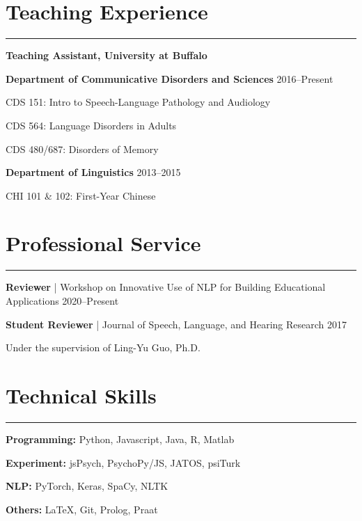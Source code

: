 \documentclass[11pt]{article}
\newcommand{\cvsection}[1]{\vspace{-0.2cm}\section*{\Large #1}\vspace{-0.2cm}\hrule\vspace{0.2cm}}
\begin{document}
\cvsection{Teaching Experience}

\textbf{Teaching Assistant, University at Buffalo}

\textbf{Department of Communicative Disorders and Sciences} \hfill 2016--Present

\quad CDS 151: Intro to Speech-Language Pathology and Audiology

\quad CDS 564: Language Disorders in Adults

\quad CDS 480/687: Disorders of Memory

\textbf{Department of Linguistics} \hfill 2013--2015

\quad CHI 101 \& 102: First-Year Chinese


\cvsection{Professional Service}

\textbf{Reviewer} | Workshop on Innovative Use of NLP for Building Educational Applications \hfill 2020--Present

\textbf{Student Reviewer} | Journal of Speech, Language, and Hearing Research \hfill 2017

\quad Under the supervision of Ling-Yu Guo, Ph.D.

\cvsection{Technical Skills}

\textbf{Programming:} Python, Javascript, Java, R, Matlab

\textbf{Experiment:} jsPsych, PsychoPy/JS, JATOS, psiTurk

\textbf{NLP:} PyTorch, Keras, SpaCy, NLTK

\textbf{Others:} \LaTeX, Git, Prolog, Praat





\end{document}
